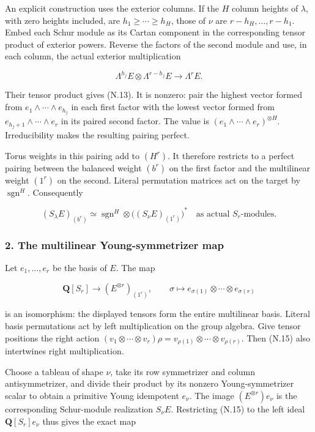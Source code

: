 \documentclass[
  10pt,
]{article}
\begin{document}
An explicit construction uses the exterior columns. If the \(H\) column
heights of \(\lambda\), with zero heights included, are
\(h_1\ge\cdots\ge h_H\), those of \(\nu\) are \(r-h_H,\ldots,r-h_1\).
Embed each Schur module as its Cartan component in the corresponding
tensor product of exterior powers. Reverse the factors of the second
module and use, in each column, the actual exterior multiplication

\[
\Lambda^{h_j}E\otimes\Lambda^{r-h_j}E\longrightarrow\Lambda^rE.
\]

Their tensor product gives (N.13). It is nonzero: pair the highest
vector formed from \(e_1\wedge\cdots\wedge e_{h_j}\) in each first
factor with the lowest vector formed from
\(e_{h_j+1}\wedge\cdots\wedge e_r\) in its paired second factor. The
value is \((e_1\wedge\cdots\wedge e_r)^{\otimes H}\). Irreducibility
makes the resulting pairing perfect.

Torus weights in this pairing add to \((H^r)\). It therefore restricts
to a perfect pairing between the balanced weight \((b^r)\) on the first
factor and the multilinear weight \((1^r)\) on the second. Literal
permutation matrices act on the target by \(\operatorname{sgn}^H\).
Consequently

\[
(S_\lambda E)_{(b^r)}
\simeq\operatorname{sgn}^H\otimes
\bigl((S_\nu E)_{(1^r)}\bigr)^*
\quad\text{as actual }S_r\text{-modules}.
\tag{N.14}
\]

\subsubsection{2. The multilinear Young-symmetrizer
map}\label{the-multilinear-young-symmetrizer-map}

Let \(e_1,\ldots,e_r\) be the basis of \(E\). The map

\[
\mathbf Q[S_r]\longrightarrow(E^{\otimes r})_{(1^r)},
\qquad
\sigma\longmapsto
e_{\sigma(1)}\otimes\cdots\otimes e_{\sigma(r)}
\tag{N.15}
\]

is an isomorphism: the displayed tensors form the entire multilinear
basis. Literal basis permutations act by left multiplication on the
group algebra. Give tensor positions the right action
\((v_1\otimes\cdots\otimes v_r)\rho
=v_{\rho(1)}\otimes\cdots\otimes v_{\rho(r)}\). Then (N.15) also
intertwines right multiplication.

Choose a tableau of shape \(\nu\), take its row symmetrizer and column
antisymmetrizer, and divide their product by its nonzero
Young-symmetrizer scalar to obtain a primitive Young idempotent
\(e_\nu\). The image \((E^{\otimes r})e_\nu\) is the corresponding
Schur-module realization \(S_\nu E\). Restricting (N.15) to the left
ideal \(\mathbf Q[S_r]e_\nu\) thus gives the exact map
\end{document}
